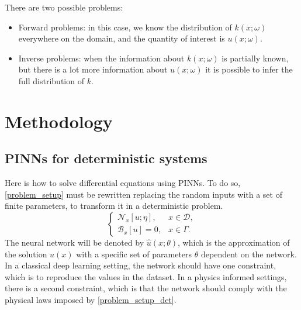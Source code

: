 \documentclass[11pt,a4paper]{article}
\begin{document}
There are two possible problems: 
\begin{itemize}
    \item Forward problems: in this case, we know the distribution of \(k(x;\omega)\) everywhere on the domain, and the quantity of interest is \(u(x;\omega)\).
    \item Inverse problems: when the information about \(k(x;\omega)\) is partially known, but there is a lot more information about \(u(x;\omega)\) it is possible to infer the full distribution of \(k\).
\end{itemize}

\section{Methodology}
\subsection{PINNs for deterministic systems}
Here is how to solve differential equations using PINNs. To do so, \eqref{problem_setup} must be rewritten replacing the random inputs with a set of finite parameters, to transform it in a deterministic problem.
\begin{equation}
    \begin{cases}
        \mathcal{N}_x\left[ u; \eta \right], & x \in \mathcal{D}, \\
        \mathcal{B}_x\left[ u \right] = 0, & x \in \Gamma.
    \end{cases}
    \label{problem_setup_det}
\end{equation}
The neural network will be denoted by \(\hat{u}(x;\theta)\), which is the approximation of the solution \(u(x)\) with a specific set of parameters \(\theta\) dependent on the network. In a classical deep learning setting, the network should have one constraint, which is to reproduce the values in the dataset. In a physics informed settings, there is a second constraint, which is that the network should comply with the physical laws imposed by \eqref{problem_setup_det}. 
\end{document}
